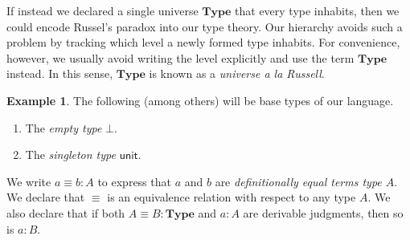 \documentclass[10pt,letterpaper,cm]{nupset}
\theoremstyle{definition}
\newtheorem{exmp}[definition]{Example}
\theoremstyle{theorem}
\theoremstyle{remark}
\newcommand{\1}{\mathbf{1}}
\newcommand{\0}{\vec 0}
\begin{document}
If instead we declared a single universe $\mathbf{Type}$ that every type inhabits, then we could encode Russel's paradox into our type theory. Our hierarchy avoids such a problem by tracking which level a newly formed type inhabits. For convenience, however, we usually avoid writing the level explicitly and use the term $\mathbf{Type}$ instead. In this sense, $\mathbf{Type}$ is known as a \textit{universe a la Russell}.
\begin{exmp} The following (among others) will be base types of our language.
\begin{enumerate}
\item The \textit{empty type} $\bot$.
\item The \textit{singleton type} $\mathsf{unit}$.
\end{enumerate}
\end{exmp}
We write $a\equiv b :A$ to express that $a$ and $b$ are \textit{definitionally equal terms type $A$}. We declare that $\equiv$ is an equivalence relation with respect to any type $A$. We also declare that if both $A\equiv B : \mathbf{Type}$ and $a: A$ are derivable judgments, then so is $a:B$.
\end{document}
